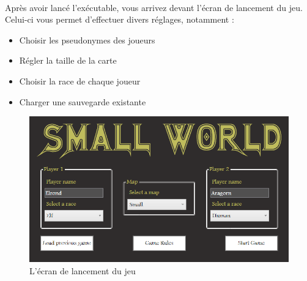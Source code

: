 \documentclass[a4paper]{article}
\begin{document}
\paragraph{}
Après avoir lancé l'exécutable, vous arrivez devant l'écran de lancement du jeu. Celui-ci vous permet d’effectuer divers réglages, notamment :

\begin{itemize}
    \item Choisir les pseudonymes des joueurs
    \item Régler la taille de la carte
    \item Choisir la race de chaque joueur
    \item Charger une sauvegarde existante
\end{itemize}


\begin{figure}[h]
\begin{center}
\includegraphics[scale=0.4]{./img/start_screen.png}
\caption{L'écran de lancement du jeu}
\end{center}
\end{figure}
\end{document}
